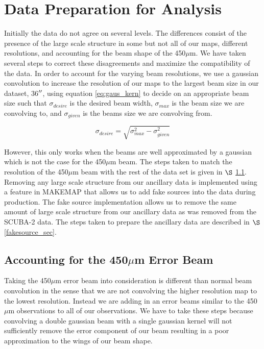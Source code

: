 \section{Data Preparation for Analysis}

Initially the data do not agree on several levels.  The differences consist of the presence of the large scale structure in some but not all of our maps, different resolutions, and accounting for the beam shape of the 450$\mu$m.  We have taken several steps to correct these disagreements and maximize the compatibility of the data.  In order to account for the varying beam resolutions, we use a gaussian convolution to increase the resolution of our maps to the largest beam size in our dataset, 36$\mbox{$^{\prime\prime}$}$, using equation \ref{eq:gaus_kern} to decide on an appropriate beam size such that $\sigma_{desire}$ is the desired beam width, $\sigma_{max}$ is the beam size we are convolving to, and $\sigma_{given}$ is the beams size we are convolving from.

\begin{equation}\label{eq:gaus_kern}
  \sigma_{desire} = \sqrt{\sigma_{max}^2 - \sigma_{given}^2}
\end{equation}

However, this only works when the beams are well approximated by a gaussian which is not the case for the 450$\mu$m beam.  The steps taken to match the resolution of the 450$\mu$m beam with the rest of the data set is given in $\S$ \ref{450_fix_sec}.  Removing any large scale structure from our ancillary data is implemented using a feature in MAKEMAP that allows us to add fake sources into the data during production.  The fake source implementation allows us to remove the same amount of large scale structure from our ancillary data as was removed from the SCUBA-2 data.  The steps taken to prepare the ancillary data are described in $\S$\ref{fakesource_sec}.


\subsection{Accounting for the 450$\mu$m Error Beam}\label{450_fix_sec}

Taking the 450$\mu$m error beam into consideration is different than normal beam convolution in the sense that we are not convolving the higher resolution map to the lowest resolution.  Instead we are adding in an error beams similar to the 450$\mu$m observations to all of our observations.  We have to take these steps because convolving a double gaussian beam with a single gaussian kernel will not sufficiently remove the error component of our beam resulting in a poor approximation to the wings of our beam shape.

